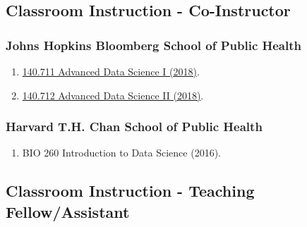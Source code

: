 \documentclass[10pt]{article}
\newcommand{\dn}[1]{{\color{black} {#1}}}
\newcommand{\myben}[1]{\smallskip\begin{enumerate}[start=1,label={\scriptsize \arabic*$\ $},leftmargin=\parindent]\setlength{\itemsep}{#1}\vspace*{-0.7em}}
\newcommand{\mydot}[1]{\begin{enumerate}[label=$\circ$,leftmargin=\parindent]\setlength{\itemsep}{#1}}
\newcommand{\ee}{\end{enumerate}}
\newcommand{\mylift}[1]{\vspace*{#1}}
\begin{document}






\mylift{-1.5em}
\subsection*{Classroom Instruction - Co-Instructor}

\subsubsection*{Johns Hopkins Bloomberg School of Public Health}

\mydot{-0.1em}

\item \href{https://jhu-advdatasci.github.io/2018/}{140.711 Advanced Data Science I (2018)}.
\item \href{https://jhu-advdatasci.github.io/2018/}{140.712 Advanced Data Science II (2018)}.

\ee

\subsubsection*{Harvard T.H. Chan School of Public Health}

\mydot{-0.1em}

\item BIO 260 Introduction to Data Science (2016).

\ee


\mylift{-1.5em}
\subsection*{Classroom Instruction - Teaching Fellow/Assistant}
\end{document}

